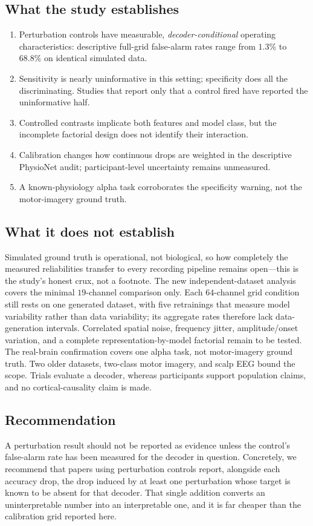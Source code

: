 \documentclass[manuscript,nonacm]{acmart}
\begin{document}
\subsection{What the study establishes}
\begin{enumerate}
\item Perturbation controls have measurable, \emph{decoder-conditional} operating
      characteristics: descriptive full-grid false-alarm
      rates range from $1.3\%$ to $68.8\%$ on identical simulated data.
\item Sensitivity is nearly uninformative in this setting; specificity does all the
      discriminating. Studies that report only that a control fired have reported the
      uninformative half.
\item Controlled contrasts implicate both features and model class, but the incomplete
      factorial design does not identify their interaction.
\item Calibration changes how continuous drops are weighted in the descriptive
      PhysioNet audit; participant-level uncertainty remains unmeasured.
\item A known-physiology alpha task corroborates the specificity warning, not the motor-imagery ground truth.
\end{enumerate}

\subsection{What it does not establish}
Simulated ground truth is operational, not biological, so how completely the measured
reliabilities transfer to every recording pipeline remains open---this is the study's
honest crux, not a footnote. The new independent-dataset analysis covers the minimal
$19$-channel comparison only. Each $64$-channel grid condition still rests on one
generated dataset, with five retrainings that measure model variability rather than data
variability; its aggregate rates therefore lack data-generation intervals. Correlated
spatial noise, frequency jitter, amplitude/onset variation, and a complete
representation-by-model factorial remain to be tested. The real-brain confirmation
covers one alpha task, not motor-imagery ground truth. Two older datasets, two-class
motor imagery, and scalp EEG bound the scope. Trials evaluate a decoder, whereas
participants support population claims, and no cortical-causality claim is made.

\subsection{Recommendation}
A perturbation result should not be reported as evidence unless the control's false-alarm
rate has been measured for the decoder in question. Concretely, we recommend that papers
using perturbation controls report, alongside each accuracy drop, the drop induced by at
least one perturbation whose target is known to be absent for that decoder. That single
addition converts an uninterpretable number into an interpretable one, and it is far
cheaper than the calibration grid reported here.
\end{document}

